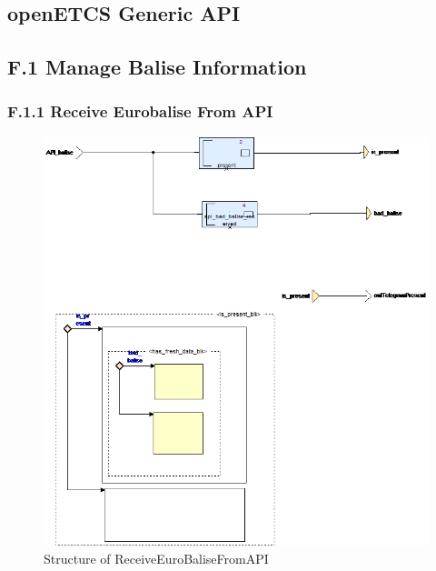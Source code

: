 \documentclass{template/openetcs_article}
\begin{document}
\subsection{openETCS Generic API}



\subsection{F.1 Manage Balise Information}


\subsubsection{F.1.1 Receive Eurobalise From API}

\begin{figure}[hbtp]
\centering
\includegraphics[scale=0.5]{../images/ReceiveEuroBaliseFromAPI_diagram.png}
\caption{Structure of ReceiveEuroBaliseFromAPI}
\end{figure}
\end{document}
